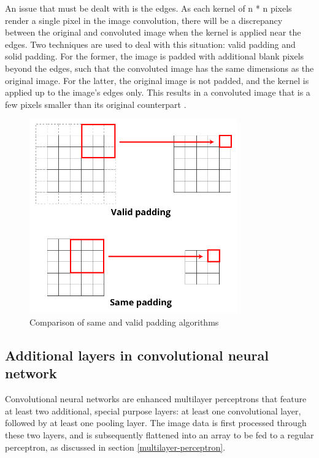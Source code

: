 \documentclass[12pt,a4paper,notitlepage]{article}
\begin{document}
An issue that must be dealt with is the edges. As each kernel of n * n pixels render a single pixel in the image convolution, there will be a discrepancy between the original and convoluted image when the kernel is applied near the edges. Two techniques are used to deal with this situation: valid padding and solid padding. For the former, the image is padded with additional blank pixels beyond the edges, such that the convoluted image has the same dimensions as the original image. For the latter, the original image is not padded, and the kernel is applied up to the image's edges only. This results in a convoluted image that is a few pixels smaller than its original counterpart \cite{saha_comprehensive_2018}.

\begin{figure}[htbp]
	\centering
		\includegraphics[width=0.80\textwidth]{images/padding-illustration.png}
	\caption{Comparison of same and valid padding algorithms}
	\label{fig:padding-illustration}
\end{figure}

\subsection{Additional layers in convolutional neural network}
Convolutional neural networks are enhanced multilayer perceptrons that feature at least two additional, special purpose layers: at least one convolutional layer, followed by at least one pooling layer. The image data is first processed through these two layers, and is subsequently flattened into an array to be fed to a regular perceptron, as discussed in section \ref{multilayer-perceptron}.
\end{document}
